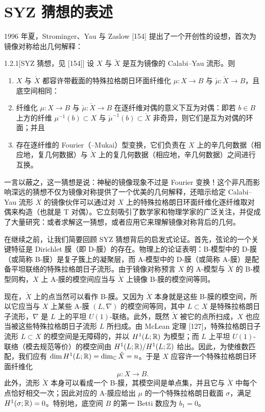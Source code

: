 \section{SYZ 猜想的表述}
1996 年夏，Strominger、Yau 与 Zaslow [154] 提出了一个开创性的设想，首次为镜像对称给出几何解释：

\begin{conjecture}{1.2.1}[SYZ 猜想，见 {[}154{]}]
设 $X$ 与 $\check X$ 是互为镜像的 Calabi--Yau 流形。则
\begin{enumerate}
  \item $X$ 与 $\check X$ 都容许带截面的特殊拉格朗日环面纤维化 $\mu : X \to B$ 与 $\check\mu : \check X \to B$，且底空间相同：
  \begin{center}
  \end{center}
  \item 纤维化 $\mu : X \to B$ 与 $\check\mu : \check X \to B$ 在逐纤维对偶的意义下互为对偶：即若 $b \in B$ 上方的纤维 $\mu^{-1}(b) \subset X$ 与 $\check\mu^{-1}(b) \subset \check X$ 非奇异，则它们是互为对偶的环面；并且
  \item 存在逐纤维的 Fourier（--Mukai）型变换，它们负责在 $X$ 上的辛几何数据（相应地，复几何数据）与 $\check X$ 上的复几何数据（相应地，辛几何数据）之间进行互换。
\end{enumerate}
\end{conjecture}

一言以蔽之，这一猜想是说：神秘的镜像现象不过是 Fourier 变换！这个非凡而影响深远的猜想不仅为镜像对称提供了一个优美的几何解释，还暗示给定 Calabi--Yau 流形 $X$ 的镜像伙伴可以通过对 $X$ 上的特殊拉格朗日环面纤维化逐纤维取对偶来构造（也就是 T 对偶）。它立刻吸引了数学家和物理学家的广泛关注，并促成了大量研究：或者求解这一猜想，或者应用它来理解镜像对称背后的几何。

在继续之前，让我们简要回顾 SYZ 猜想背后的启发式论证。首先，弦论的一个关键特征是 Dirichlet 膜（即 D-膜）的存在。物理上的论证表明：B-模型中的 D-膜（或简称 B-膜）是复子簇上的凝聚层，而 A-模型中的 D-膜（或简称 A-膜）是配备平坦联络的特殊拉格朗日子流形。由于镜像对称预言 $X$ 的 A-模型与 $\check X$ 的 B-模型同构，$X$ 上 A-膜的模空间应当与 $\check X$ 上镜像 B-膜的模空间等同。

现在，$\check X$ 上的点当然可以看作 B-膜。又因为 $\check X$ 本身就是这些 B-膜的模空间，所以它应当与 $X$ 上某些 A-膜 $(L,\nabla)$ 的模空间等同，其中 $L \subset X$ 是特殊拉格朗日子流形，$\nabla$ 是 $L$ 上的平坦 $U(1)$-联络。此外，既然 $\check X$ 被它的点所扫成，$X$ 也应当被这些特殊拉格朗日子流形 $L$ 所扫成。由 McLean 定理 [127]，特殊拉格朗日子流形 $L \subset X$ 的模空间是无障碍的，并以 $H^1(L;\mathbb{R})$ 为模型；而 $L$ 上平坦 $U(1)$-联络（模去规范等价）的模空间由 $H^1(L;\mathbb{R})/H^1(L;\mathbb{Z})$ 给出。因此，为使维数匹配，我们应有 $\dim H^1(L;\mathbb{R}) = \dim_{\mathbb{C}} \check X = n$。于是 $X$ 应容许一个特殊拉格朗日环面纤维化
\[
  \mu : X \to B .
\]
此外，流形 $\check X$ 本身可以看成一个 B-膜，其模空间是单点集，并且它与 $\check X$ 中每个点恰好相交一次；因此对应的 A-膜应给出 $\mu$ 的一个特殊拉格朗日截面 $\sigma$，满足 $H^1(\sigma;\mathbb{R})=0$。特别地，底空间 $B$ 的第一 Betti 数应为 $b_1 = 0$。

